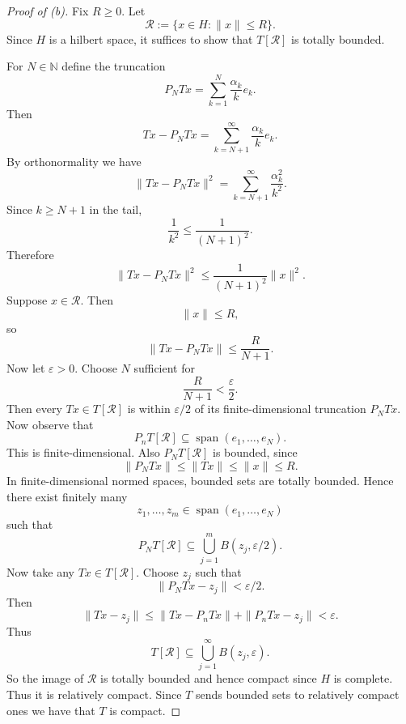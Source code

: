 \begin{proof}[Proof of (b)]
    Fix $R \geq 0$. 
    Let 
    \[
        \mathcal R := 
        \{x \in H : \|x\| \leq R\}. 
    \]
    Since $H$ is a hilbert space, it suffices to show that 
    $T[\mathcal R]$ is totally bounded. 

    For $N \in \mathbb N$ define the truncation 
    \[
        P_NTx = \sum_{k=1}^N \frac{\alpha_k}{k} e_k. 
    \]
    Then 
    \[
        Tx - P_NTx = \sum_{k=N+1}^\infty \frac{\alpha_k}{k} e_k.
    \]
    By orthonormality we have 
    \[
        \|Tx - P_NTx\|^2 = \sum_{k=N+1}^\infty \frac{\alpha^2_k}{k^2}.
    \]
    Since $k \geq N + 1$ in the tail, 
    \[
        \frac{1}{k^2} \leq \frac{1}{(N+1)^2}.
    \]
    Therefore 
    \[
        \|Tx - P_N Tx\|^2 \leq \frac{1}{(N+1)^2} \|x\|^2. 
    \]
    Suppose $x \in \mathcal R$. Then 
    \[
        \|x\| \leq R, 
    \]
    so 
    \[
        \|Tx - P_NTx\| \leq \frac{R}{N+1}. 
    \]
    Now let $\varepsilon > 0$. Choose $N$ sufficient for 
    \[
        \frac{R}{N+1} < \frac{\varepsilon}{2}. 
    \]
    Then every $Tx \in T[\mathcal R]$ is within 
    $\varepsilon / 2$ of its finite-dimensional truncation $P_NTx$. 
    Now observe that 
    \[
        P_nT[\mathcal R] \subseteq \operatorname{span}(e_1,\ldots, 
        e_N). 
    \]
    This is finite-dimensional. Also $P_NT[\mathcal R]$ is bounded, 
    since 
    \[
        \|P_NTx\| \leq \|Tx\| \leq \|x\| \leq R.
    \]
    In finite-dimensional normed spaces, bounded sets 
    are totally bounded. Hence there exist finitely many 
    \[
        z_1, \ldots, z_m \in \operatorname{span}(e_1,\ldots, e_N)
    \]
    such that 
    \[
        P_NT[\mathcal R] \subseteq \bigcup_{j=1}^m B(z_j,  
        \varepsilon/2). 
    \]
    Now take any $Tx \in T[\mathcal R]$. Choose $z_j$ such that 
    \[
        \|P_NTx - z_j\| < \varepsilon/2. 
    \]
    Then 
    \[
        \|Tx - z_j\| \leq \|Tx - P_nTx\| + 
        \|P_nTx - z_j\| < \varepsilon. 
    \]
    Thus 
    \[
        T[\mathcal R] \subseteq \bigcup_{j=1}^\infty B(z_j, 
        \varepsilon). 
    \]
    So the image of $\mathcal R$ is totally bounded and 
    hence compact since $H$ is complete. Thus 
    it is relatively compact. Since $T$ sends bounded sets 
    to relatively compact ones we have that $T$ is compact. 
\end{proof}

